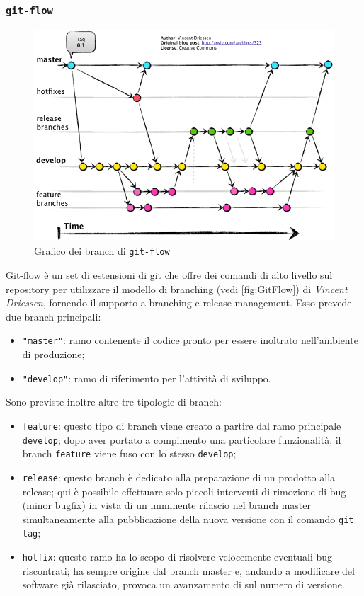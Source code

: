 \subsubsection{\texttt{git-flow}}
\begin{figure}[H]
\begin{center}
\includegraphics[width=12cm]{Pics/gitflow.png}
\caption{Grafico dei branch di \texttt{git-flow}}
\label{fig:GitFlow}
\end{center}
\end{figure}
Git-flow è un set di estensioni di git che offre dei comandi di alto livello sul repository per utilizzare il modello di branching (vedi \autoref{fig:GitFlow}) di \textit{Vincent Driessen}, fornendo il supporto a branching e release management.
Esso prevede due branch principali:
\begin{itemize}
\item \texttt{"master"}: ramo contenente il codice pronto per essere inoltrato nell'ambiente di produzione;
\item \texttt{"develop"}: ramo di riferimento per l'attività di sviluppo.
\end{itemize}
Sono previste inoltre altre tre tipologie di branch:
\begin{itemize}
\item \texttt{feature}: questo tipo di branch viene creato a partire dal ramo principale \texttt{develop}; dopo aver portato a compimento una particolare funzionalità, il branch \texttt{feature} viene fuso con lo stesso \texttt{develop};
\item \texttt{release}: questo branch è dedicato alla preparazione di un prodotto alla release; qui è possibile effettuare solo piccoli interventi di rimozione di bug (minor bugfix) in vista di un imminente rilascio nel branch master simultaneamente alla pubblicazione della nuova versione con il comando \texttt{git tag};
\item \texttt{hotfix}: questo ramo ha lo scopo di risolvere velocemente eventuali bug riscontrati; ha sempre origine dal branch master e, andando a modificare del software già rilasciato, provoca un avanzamento di sul numero di versione.
\end{itemize}
